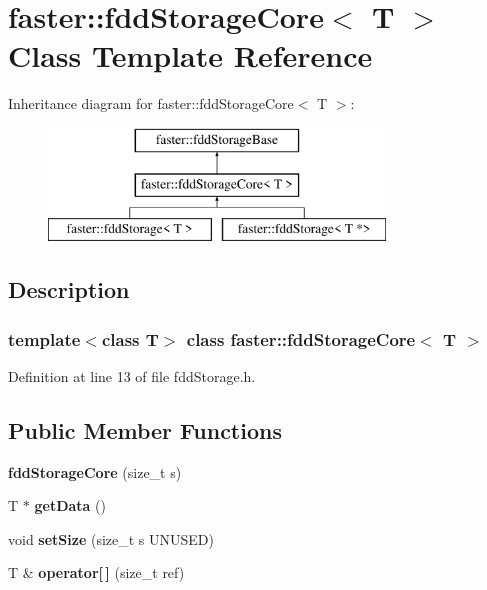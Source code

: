 \hypertarget{classfaster_1_1fddStorageCore}{}\section{faster\+:\+:fdd\+Storage\+Core$<$ T $>$ Class Template Reference}
\label{classfaster_1_1fddStorageCore}
Inheritance diagram for faster\+:\+:fdd\+Storage\+Core$<$ T $>$\+:\begin{figure}[H]
\begin{center}
\leavevmode
\includegraphics[height=3.000000cm]{classfaster_1_1fddStorageCore}
\end{center}
\end{figure}


\subsection{Description}
\subsubsection*{template$<$class T$>$\newline
class faster\+::fdd\+Storage\+Core$<$ T $>$}



Definition at line 13 of file fdd\+Storage.\+h.

\subsection*{Public Member Functions}
\begin{DoxyCompactItemize}
\item 
\hypertarget{classfaster_1_1fddStorageCore_aaae0b252366d73dec3995251fdc75920}{}\label{classfaster_1_1fddStorageCore_aaae0b252366d73dec3995251fdc75920} 
{\bfseries fdd\+Storage\+Core} (size\+\_\+t s)
\item 
\hypertarget{classfaster_1_1fddStorageCore_aa3d19bc27af39d838226ab3e196beb15}{}\label{classfaster_1_1fddStorageCore_aa3d19bc27af39d838226ab3e196beb15} 
T $\ast$ {\bfseries get\+Data} ()
\item 
\hypertarget{classfaster_1_1fddStorageCore_a6bf9e9e16bdcaf4164ac5a3d28848ec0}{}\label{classfaster_1_1fddStorageCore_a6bf9e9e16bdcaf4164ac5a3d28848ec0} 
void {\bfseries set\+Size} (size\+\_\+t s U\+N\+U\+S\+ED)
\item 
\hypertarget{classfaster_1_1fddStorageCore_ad4608901a31ab093edc8be2a3852a014}{}\label{classfaster_1_1fddStorageCore_ad4608901a31ab093edc8be2a3852a014} 
T \& {\bfseries operator\mbox{[}$\,$\mbox{]}} (size\+\_\+t ref)
\end{DoxyCompactItemize}
